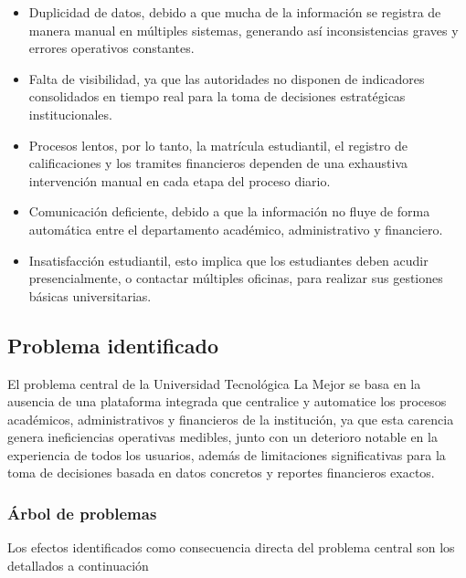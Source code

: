 \documentclass[11pt,spanish]{article}
\begin{document}
\begin{itemize}
    \item Duplicidad de datos, debido a que mucha de la información se registra de manera manual en múltiples sistemas, generando así inconsistencias graves y errores operativos constantes.
    \item Falta de visibilidad, ya que las autoridades no disponen de indicadores consolidados en tiempo real para la toma de decisiones estratégicas institucionales.
    \item Procesos lentos, por lo tanto, la matrícula estudiantil, el registro de calificaciones y los tramites financieros dependen de una exhaustiva intervención manual en cada etapa del proceso diario.
    \item Comunicación deficiente, debido a que la información no fluye de forma automática entre el departamento académico, administrativo y financiero.
    \item Insatisfacción estudiantil, esto implica que los estudiantes deben acudir presencialmente, o contactar múltiples oficinas, para realizar sus gestiones básicas universitarias.
\end{itemize}

\subsection{Problema identificado}

El problema central de la Universidad Tecnológica La Mejor se basa en la ausencia de una plataforma integrada que centralice y automatice los procesos académicos, administrativos y financieros de la institución, ya que esta carencia genera ineficiencias operativas medibles, junto con un deterioro notable en la experiencia de todos los usuarios, además de limitaciones significativas para la toma de decisiones basada en datos concretos y reportes financieros exactos.

\subsubsection{Árbol de problemas}

Los efectos identificados como consecuencia directa del problema central son los detallados a continuación
\end{document}
